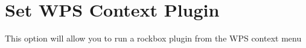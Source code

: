 \section{\label{ref:SetWPSContextPlugin}Set WPS Context Plugin}

  \begin{description}
  {This option will allow you to run a rockbox plugin from the WPS context menu}
   \end{description}
